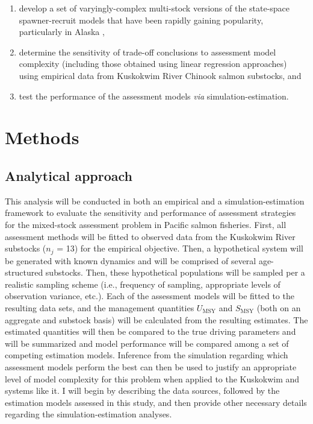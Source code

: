 \documentclass[12pt,]{book}
\theoremstyle{definition}
\theoremstyle{definition}
\theoremstyle{definition}
\theoremstyle{remark}
\begin{document}
\begin{enumerate}
\def\labelenumi{(\arabic{enumi})}
\item
  develop a set of varyingly-complex multi-stock versions of the
  state-space spawner-recruit models that have been rapidly gaining
  popularity, particularly in Alaska
  \citep{walters-martell-2004, su-peterman-2012, fleischman-etal-2013, staton-etal-2017-intseq},
\item
  determine the sensitivity of trade-off conclusions to assessment model
  complexity (including those obtained using linear regression
  approaches) using empirical data from Kuskokwim River Chinook salmon
  substocks, and
\item
  test the performance of the assessment models \emph{via}
  simulation-estimation.
\end{enumerate}

\section{Methods}\label{methods}

\subsection{Analytical approach}\label{analytical-approach}

\noindent
This analysis will be conducted in both an empirical and a
simulation-estimation framework to evaluate the sensitivity and
performance of assessment strategies for the mixed-stock assessment
problem in Pacific salmon fisheries. First, all assessment methods will
be fitted to observed data from the Kuskokwim River substocks (\(n_j\) =
13) for the empirical objective. Then, a hypothetical system will be
generated with known dynamics and will be comprised of several
age-structured substocks. Then, these hypothetical populations will be
sampled per a realistic sampling scheme (i.e., frequency of sampling,
appropriate levels of observation variance, etc.). Each of the
assessment models will be fitted to the resulting data sets, and the
management quantities \(U_{\text{MSY}}\) and \(S_{\text{MSY}}\) (both on
an aggregate and substock basis) will be calculated from the resulting
estimates. The estimated quantities will then be compared to the true
driving parameters and will be summarized and model performance will be
compared among a set of competing estimation models. Inference from the
simulation regarding which assessment models perform the best can then
be used to justify an appropriate level of model complexity for this
problem when applied to the Kuskokwim and systems like it. I will begin
by describing the data sources, followed by the estimation models
assessed in this study, and then provide other necessary details
regarding the simulation-estimation analyses.
\end{document}
